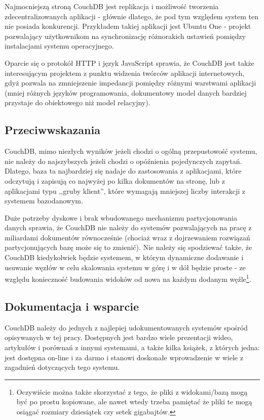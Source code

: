 Najmocniejszą stroną CouchDB jest replikacja i możliwość tworzenia zdecentralizowanych aplikacji - głównie dlatego, że pod tym względem system ten nie posiada konkurencji.
Przykładem takiej aplikacji jest Ubuntu One - projekt pozwalający użytkownikom na synchronizację różnorakich ustawień pomiędzy instalacjami systemu operacyjnego.

Oparcie się o protokół HTTP i język JavaScript sprawia, że CouchDB jest także interesującym projektem z punktu widzenia twórców aplikacji internetowych, gdyż pozwala na zmniejszenie impedancji pomiędzy różnymi warstwami aplikacji (mniej różnych języków programowania, dokumentowy model danych bardziej przystaje do obiektowego niż model relacyjny).

\subsection*{Przeciwwskazania}

CouchDB, mimo niezłych wyników jeżeli chodzi o ogólną przepustowość systemu, nie należy do najszybszych jeżeli chodzi o opóźnienia pojedynczych zapytań.
Dlatego, baza ta najbardziej się nadaje do zastosowania z aplikacjami, które odczytują i zapisują co najwyżej po kilka dokumentów na stronę, lub z aplikacjami typu ,,gruby klient'', które wymagają mniejszej liczby interakcji z systemem bazodanowym.

Duże potrzeby dyskowe i brak wbudowanego mechanizmu partycjonowania danych sprawia, że CouchDB nie należy do systemów pozwalających na pracę z miliardami dokumentów równocześnie (chociaż wraz z dojrzewaniem rozwiązań partycjonujących bazę może się to zmienić).
Nie należy się spodziewać także, że CouchDB kiedykolwiek będzie systemem, w którym dynamiczne dodawanie i usuwanie węzłów w celu skalowania systemu w górę i w dół będzie proste - ze względu konieczność budowania widoków od nowa na każdym dodanym węźle\footnote{Oczywiście można także skorzystać z tego, że pliki z widokami/bazą mogą być po prostu kopiowane, ale nawet wtedy trzeba pamiętać że pliki te mogą osiągać rozmiary dziesiątek czy setek gigabajtów.}. 

\subsection*{Dokumentacja i wsparcie}

CouchDB należy do jednych z najlepiej udokumentowanych systemów spośród opisywanych w tej pracy.
Dostępnych jest bardzo wiele prezentacji wideo, artykułów i porównań z innymi systemami, a także kilka książek, z których jedna: \cite{couchdb-guide} jest dostępna on-line i za darmo i stanowi doskonałe wprowadzenie w wiele z zagadnień dotyczących tego systemu.

